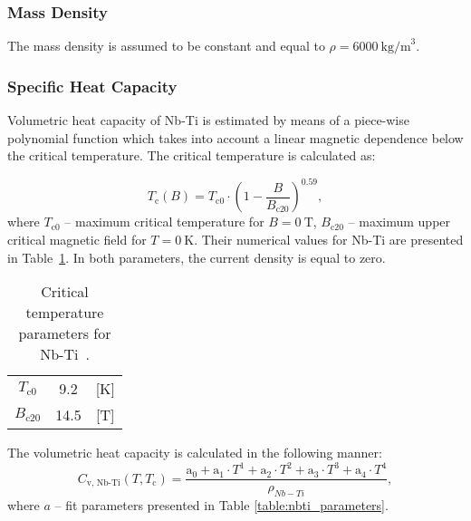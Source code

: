 
\subsubsection{Mass Density}
The mass density is assumed to be constant and equal to $\rho = 6000~\text{kg/m}^{3}$.

\subsubsection{Specific Heat Capacity}
Volumetric heat capacity of Nb-Ti is estimated by means of a piece-wise polynomial function which takes into account a linear magnetic dependence below the critical temperature. The critical temperature is calculated as: 

\begin{equation}
    T_\text{c}(B) = T_\text{c0}\cdot(1-\frac{B}{B_\text{c20}})^{0.59},
\end{equation}
where $T_\text{c0}$ -- maximum critical temperature for $B=0~\text{T}$, $B_\text{c20}$ -- maximum upper critical magnetic field for $T=0~\text{K}$. Their numerical values for Nb-Ti are presented in Table~\ref{table: appendix_nb_ti_crit_temp_params}. In both parameters, the current density is equal to zero. 

\newpage
\begin{table}[h!]
    \caption{Critical temperature parameters for Nb-Ti~\cite{empirical_scaling_formulas_for_critical_current}.} 
    \vspace{-1.em} 
    \fontsize{10}{10}
    \selectfont 
    \renewcommand{\arraystretch}{1.5}
    \begin{center}
        \begin{tabular}{ ccc }  
        \hline
        $T_\text{c0}$ & 9.2 & [K] \\
        $B_\text{c20}$ & 14.5 & [T] \\
        \hline 
        \end{tabular}
    \end{center}  
     \label{table: appendix_nb_ti_crit_temp_params} 
 \end{table}

The volumetric heat capacity is calculated in the following manner: 
\begin{equation}
    C_\text{v, Nb-Ti}(T, T_\text{c}) = \frac{\text{a}_0 + \text{a}_1\cdot T^{1} + \text{a}_2\cdot T^{2} + \text{a}_3\cdot T^{3}+ \text{a}_4\cdot T^{4}} {\rho_{Nb-Ti}},
\end{equation}
where $a$ -- fit parameters presented in Table \ref{table:nbti_parameters}.

